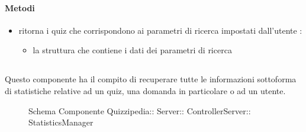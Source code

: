 \paragraph{Metodi}
\begin{itemize}
\item {}
\newline
ritorna i quiz che corrispondono ai parametri di ricerca impostati dall'utente
\newline
{} :
\begin{itemize}
\item {}
\newline
la struttura che contiene i dati dei parametri di ricerca
\end{itemize}
\end{itemize}
\subsection{}
Questo componente ha il compito di recuperare tutte le informazioni sottoforma di statistiche relative ad un quiz, una domanda in particolare o ad un utente.
\begin{figure}[H]
\centering
\noindent{}
\caption[Schema Componente Quizzipedia::Server::ControllerServer::StatisticsManager]{Schema Componente Quizzipedia:: Server:: ControllerServer:: StatisticsManager}
\end{figure}
